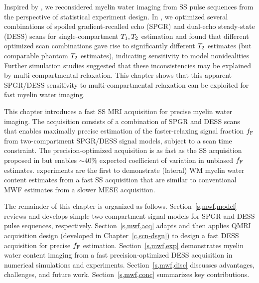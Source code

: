 Inspired by \cite{nataraj:17:oms},
we reconsidered myelin water imaging from SS pulse sequences
from the perspective of statistical experiment design.
In \cite{nataraj:17:oms},
we optimized several combinations
of spoiled gradient-recalled echo (SPGR)
\cite{zur:91:sot}
and dual-echo steady-state (DESS) scans
\cite{redpath:88:fan, bruder:88:ans}
for single-compartment $T_1,T_2$ estimation
and found that different optimized scan combinations
gave rise to significantly different \invivo $T_2$ estimates
(but comparable phantom $T_2$ estimates),
indicating \invivo sensitivity to model nonidealities
%
Further simulation studies 
suggested that these inconsistencies may be explained
by multi-compartmental relaxation.
This chapter shows that
this apparent SPGR/DESS sensitivity
to multi-compartmental relaxation
can be exploited 
for fast myelin water imaging. 

This chapter introduces
a fast SS MRI acquisition
for precise myelin water imaging.
The acquisition consists
of a combination of SPGR and DESS scans
that enables maximally precise estimation
of the faster-relaxing signal fraction $f_{\mathrm{F}}$
from two-compartment SPGR/DESS signal models,
subject to a scan time constraint.
The precision-optimized acquisition 
is as fast as the SS acquisition 
proposed in \cite{deoni:11:com}
but enables $\sim$$40$\% expected coefficient of variation
in unbiased $f_{\mathrm{F}}$ estimates.
%
\invivo experiments are the first to demonstrate
(lateral) WM myelin water content estimates
from a fast SS acquisition
that are similar
to conventional MWF estimates
from a slower MESE acquisition.

The remainder of this chapter
is organized as follows.
Section~\ref{s,mwf,model} 
reviews and develops simple two-compartment signal models
for SPGR and DESS pulse sequences,
respectively.
Section~\ref{s,mwf,acq} 
adapts and then applies QMRI acquisition design 
(developed in Chapter~\ref{c,scn-dsgn})
to design a fast DESS acquisition
for precise $f_{\mathrm{F}}$ estimation.
Section~\ref{s,mwf,exp}
demonstrates myelin water content imaging
from a fast precision-optimized DESS acquisition
in numerical simulations
and \invivo experiments.
Section~\ref{s,mwf,disc}
discusses advantages, challenges, and future work.
Section~\ref{s,mwf,conc}
summarizes key contributions.

